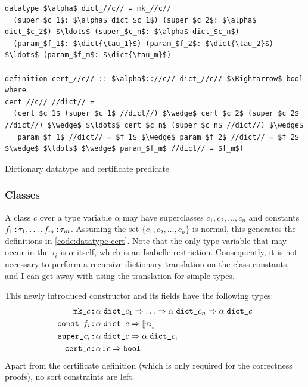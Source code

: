 \begin{code}[t]
  \begin{lstlisting}
datatype $\alpha$ dict_//c// = mk_//c//
  (super_$c_1$: $\alpha$ dict_$c_1$) (super_$c_2$: $\alpha$ dict_$c_2$) $\ldots$ (super_$c_n$: $\alpha$ dict_$c_n$)
  (param_$f_1$: $\dict{\tau_1}$) (param_$f_2$: $\dict{\tau_2}$) $\ldots$ (param_$f_m$: $\dict{\tau_m}$)

definition cert_//c// :: $\alpha$:://c// dict_//c// $\Rightarrow$ bool where
cert_//c// //dict// =
  (cert_$c_1$ (super_$c_1$ //dict//) $\wedge$ cert_$c_2$ (super_$c_2$ //dict//) $\wedge$ $\ldots$ cert_$c_n$ (super_$c_n$ //dict//) $\wedge$
   param_$f_1$ //dict// = $f_1$ $\wedge$ param_$f_2$ //dict// = $f_2$ $\wedge$ $\ldots$ $\wedge$ param_$f_m$ //dict// = $f_m$)
  \end{lstlisting}
  \caption{Dictionary datatype and certificate predicate}
  \label{code:datatype-cert}
\end{code}

\subsubsection{Classes}

A class $c$ over a type variable $\alpha$ may have superclasses $c_1, c_2, \ldots, c_n$ and constants $f_1 \mathbin{:\!\!:} \tau_1, \ldots, f_m \mathbin{:\!\!:} \tau_m$.
Assuming the set $\{ c_1, c_2, \ldots, c_n\}$ is normal, this generates the definitions in \cref{code:datatype-cert}.
Note that the only type variable that may occur in the $\tau_i$ is $\alpha$ itself, which is an Isabelle restriction.
Consequently, it is not necessary to perform a recursive dictionary translation on the class constants, and I can get away with using the translation for simple types.

This newly introduced constructor and its fields have the following types:
\begin{align*}
  \holconst{mk\_}c &\holdoublecolon \alpha\;\holconst{dict\_}c_1 \Rightarrow \ldots \Rightarrow \alpha\;\holconst{dict\_}c_n \Rightarrow \alpha\;\holconst{dict\_}c \\
  \holconst{const\_}f_i &\holdoublecolon \alpha\;\holconst{dict\_}c \Rightarrow \dict{\tau_i} \\
  \holconst{super\_}c_i &\holdoublecolon \alpha\;\holconst{dict\_}c \Rightarrow \alpha\;\holconst{dict\_}c_i \\
  \holconst{cert\_}c &\holdoublecolon \holtypejudgement{\alpha}{c} \Rightarrow \holtype{bool}
\end{align*}
Apart from the certificate definition (which is only required for the correctness proofs), no sort constraints are left.


